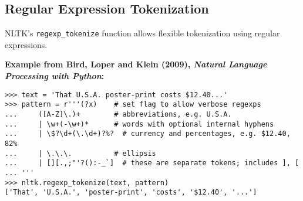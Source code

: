 \documentclass[11pt,a4paper]{article}
\theoremstyle{definition}
\theoremstyle{plain}
\theoremstyle{remark}
\begin{document}
\subsection{Regular Expression Tokenization}

NLTK's \texttt{regexp\_tokenize} function allows flexible tokenization using regular expressions.

\textbf{Example from Bird, Loper and Klein (2009), \textit{Natural Language Processing with Python}:}

\begin{verbatim}
>>> text = 'That U.S.A. poster-print costs $12.40...'
>>> pattern = r'''(?x)    # set flag to allow verbose regexps
...     ([A-Z]\.)+        # abbreviations, e.g. U.S.A.
...     | \w+(-\w+)*      # words with optional internal hyphens
...     | \$?\d+(\.\d+)?%?  # currency and percentages, e.g. $12.40, 82%
...     | \.\.\.          # ellipsis
...     | [][.,;"'?():-_`]  # these are separate tokens; includes ], [
... '''
>>> nltk.regexp_tokenize(text, pattern)
['That', 'U.S.A.', 'poster-print', 'costs', '$12.40', '...']
\end{verbatim}
\end{document}
